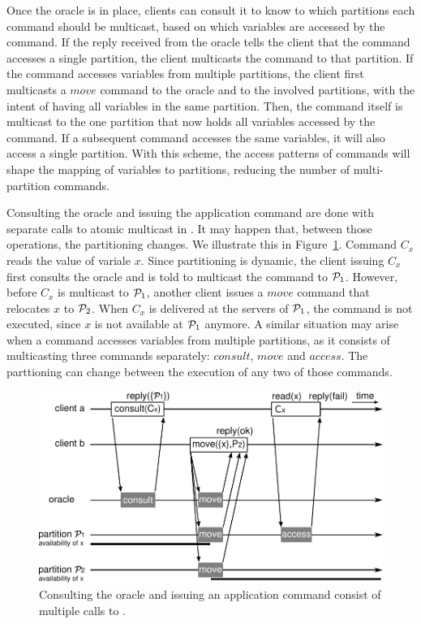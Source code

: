 
Once the oracle is in place, clients can consult it to know to which partitions each command should be multicast, based on which variables are accessed by the command.
If the reply received from the oracle tells the client that the command accesses a single partition, the client multicasts the command to that partition.
If the command accesses variables from multiple partitions, the client first multicasts a $move$ command to the oracle and to the involved partitions, with the intent of having all variables in the same partition.
Then, the command itself is multicast to the one partition that now holds all variables accessed by the command.
If a subsequent command accesses the same variables, it will also access a single partition.
With this scheme, the access patterns of commands will shape the mapping of variables to partitions, reducing the number of multi-partition commands.

Consulting the oracle and issuing the application command are done with separate calls to atomic multicast in \dssmr{}.
It may happen that, between those operations, the partitioning changes.
We illustrate this in Figure~\ref{fig:move_case_1}.
Command $C_x$ reads the value of variale $x$.
Since partitioning is dynamic, the client issuing $C_x$ first consults the oracle and is told to multicast the command to $\mathcal{P}_1$.
However, before $C_x$ is multicast to $\mathcal{P}_1$, another client issues a $move$ command that relocates $x$ to $\mathcal{P}_2$.
When $C_x$ is delivered at the servers of $\mathcal{P}_1$, the command is not executed, since $x$ is not available at $\mathcal{P}_1$ anymore.
A similar situation may arise when a command accesses variables from multiple partitions, as it consists of multicasting three commands separately: $consult$, $move$ and $access$.
The parttioning can change between the execution of any two of those commands.

\begin{figure}[b!]
  \includegraphics[width=\linewidth]{figures/move_case_1}
  \caption{Consulting the oracle and issuing an application command consist of multiple calls to \amcast{}.}
  \label{fig:move_case_1}
\end{figure}

